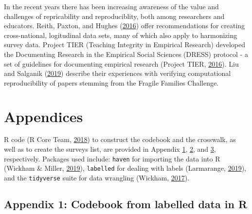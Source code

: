 \documentclass[12pt,]{article}
\begin{document}
In the recent years there has been increasing awareness of the value and challenges of repricability and reproduciblity, both among researchers and educators.
Reith, Paxton, and Hughes (\protect\hyperlink{ref-Reith2016}{2016}) offer recommendations for creating cross-national, logitudinal data sets, many of which also apply to harmonizing survey data. Project TIER (Teaching Integrity in Empirical Research) developed the Documenting Research in the Empirical Social Sciences (DRESS) protocol - a set of guidelines for documenting empirical research (Project TIER, \protect\hyperlink{ref-ProjectTIER2016}{2016}). Liu and Salganik (\protect\hyperlink{ref-Liu2019}{2019}) describe their experiences with verifying computational reproducibility of papers stemming from the Fragile Families Challenge.

\clearpage

\hypertarget{appendices}{%
\section{Appendices}\label{appendices}}

R code (R Core Team, \protect\hyperlink{ref-baser}{2018}) to construct the codebook and the crosswalk, as well as to create the surveys list, are provided in Appendix \protect\hyperlink{appendix1}{1}, \protect\hyperlink{appendix2}{2}, and \protect\hyperlink{appendix3}{3}, respectively. Packages used include: \texttt{haven} for importing the data into R (Wickham \& Miller, \protect\hyperlink{ref-haven}{2019}), \texttt{labelled} for dealing with labels (Larmarange, \protect\hyperlink{ref-labelled}{2019}), and the \texttt{tidyverse} suite for data wrangling (Wickham, \protect\hyperlink{ref-tidyverse}{2017}).

\hypertarget{appendix1}{%
\subsection{Appendix 1: Codebook from labelled data in R}\label{appendix1}}

\scriptsize
\end{document}
